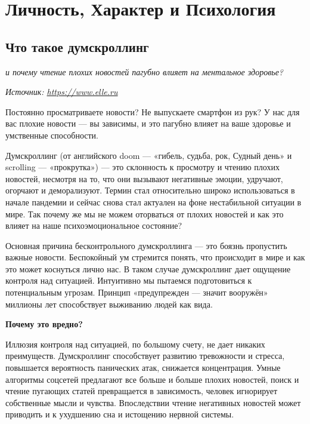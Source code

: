 \chapter{Личность, Характер и Психология}
\section{Что такое думскроллинг}

\textit{и почему чтение плохих новостей пагубно влияет на ментальное здоровье?}

\textit{Источник: \url{https://www.elle.ru}}

\begin{fancyquotes}
    Постоянно просматриваете новости? Не выпускаете смартфон из рук? У нас для вас плохие новости — вы зависимы, и это пагубно влияет на ваше здоровье и умственные способности.
\end{fancyquotes}

Думскроллинг (от английского doom — «гибель, судьба, рок, Судный день» и scrolling — «прокрутка») — это склонность к просмотру и чтению плохих новостей, несмотря на то, что они вызывают негативные эмоции, удручают, огорчают и деморализуют. Термин стал относительно широко использоваться в начале пандемии и сейчас снова стал актуален на фоне нестабильной ситуации в мире. Так почему же мы не можем оторваться от плохих новостей и как это влияет на наше психоэмоциональное состояние?

Основная причина бесконтрольного думскроллинга — это боязнь пропустить важные новости. Беспокойный ум стремится понять, что происходит в мире и как это может коснуться лично нас. В таком случае думскроллинг дает ощущение контроля над ситуацией. Интуитивно мы пытаемся подготовиться к потенциальным угрозам. Принцип «предупрежден — значит вооружён» миллионы лет способствует выживанию людей как вида.

\textbf{Почему это вредно?}

Иллюзия контроля над ситуацией, по большому счету, не дает никаких преимуществ. Думскроллинг способствует развитию тревожности и стресса, повышается вероятность панических атак, снижается концентрация. Умные алгоритмы соцсетей предлагают все больше и больше плохих новостей, поиск и чтение пугающих статей превращается в зависимость, человек игнорирует собственные мысли и чувства. Впоследствии чтение негативных новостей может приводить и к ухудшению сна и истощению нервной системы.

